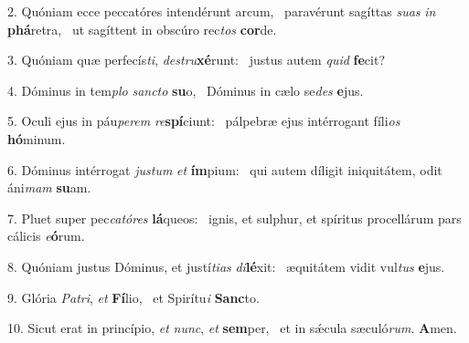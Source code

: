 2. Quóniam ecce peccatóres intendérunt arcum, \dag\  paravérunt sagíttas \textit{su}\textit{as} \textit{in} \textbf{phá}retra, \ast\  ut sagíttent in obscúro rec\textit{tos} \textbf{cor}de.\

3. Quóniam quæ perfecís\textit{ti}, \textit{de}\textit{stru}\textbf{xé}runt: \ast\  justus autem \textit{quid} \textbf{fe}cit?\

4. Dóminus in tem\textit{plo} \textit{sanc}\textit{to} \textbf{su}o, \ast\  Dóminus in cælo se\textit{des} \textbf{e}jus.\

5. Oculi ejus in páu\textit{pe}\textit{rem} \textit{re}\textbf{spí}ciunt: \ast\  pálpebræ ejus intérrogant fíli\textit{os} \textbf{hó}minum.\

6. Dóminus intérrogat \textit{jus}\textit{tum} \textit{et} \textbf{ím}pium: \ast\  qui autem díligit iniquitátem, odit áni\textit{mam} \textbf{su}am.\

7. Pluet super pec\textit{ca}\textit{tó}\textit{res} \textbf{lá}queos: \ast\  ignis, et sulphur, et spíritus procellárum pars cálicis \textit{e}\textbf{ó}rum.\

8. Quóniam justus Dóminus, et justí\textit{ti}\textit{as} \textit{di}\textbf{lé}xit: \ast\  æquitátem vidit vul\textit{tus} \textbf{e}jus.\

9. Glória \textit{Pa}\textit{tri}, \textit{et} \textbf{Fí}lio, \ast\  et Spirítu\textit{i} \textbf{Sanc}to.\

10. Sicut erat in princípio, \textit{et} \textit{nunc}, \textit{et} \textbf{sem}per, \ast\  et in sǽcula sæculó\textit{rum}. \textbf{A}men.\

